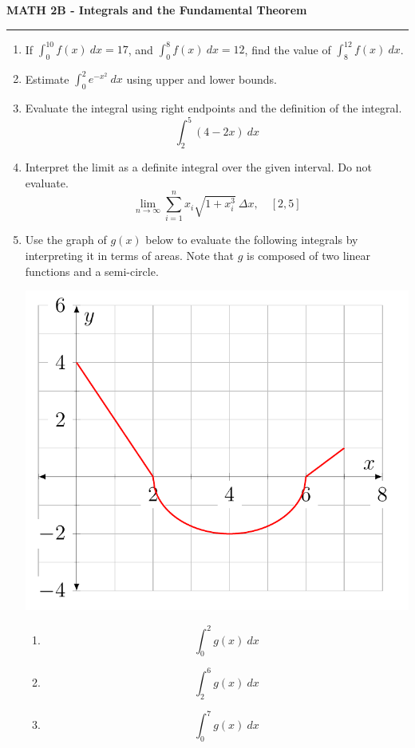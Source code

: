 \documentclass[12pt]{article}
\begin{document}
\begin{center}
{\bf \Large MATH 2B - Integrals and the Fundamental Theorem}
\vspace{0.2cm}
\hrule
\end{center}

\begin{multicols*}{2}
	\begin{enumerate}
		\item If $\int_0^{10}f(x)\ dx = 17$, and $\int_0^8 f(x)\ dx = 12$, find the value of $\int_8^12f(x)\ dx$.
		\vfill
		\item Estimate $\int_0^2 e^{-x^2}\ dx$ using upper and lower bounds.
		\vfill
		\item Evaluate the integral using right endpoints and the definition of the integral.
		\[
		\int_2^5 (4-2x)\ dx
		\]
		\vfill
		\item Interpret the limit as a definite integral over the given interval. Do not evaluate.
		\[
		\lim_{n\to \infty} \sum_{i=1}^n x_i\sqrt{1+x_i^3}\ \Delta x,\quad [2,5]
		\]
		\vfill
		\null
		\columnbreak
		\item Use the graph of $g(x)$ below to evaluate the following integrals by interpreting it in terms of areas. Note that $g$ is composed of two linear functions and a semi-circle.
		\centerline{\includegraphics[scale=.4]{graph.png}}
		\begin{enumerate}
			\item \[
			\int_0^2 g(x)\ dx
			\]
			\vfill
			\item \[
			\int_2^6 g(x)\ dx
			\]
			\vfill
			\item \[
			\int_0^7 g(x)\ dx
			\]
			\vfill\null
		\end{enumerate}
		\pagebreak


\end{enumerate}
\end{multicols*}
\end{document}
